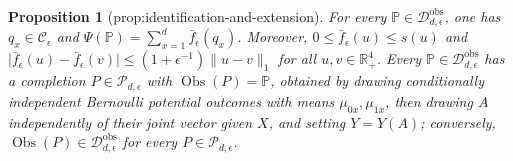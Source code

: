 \documentclass{article}
\newtheorem{proposition}{Proposition}
\begin{document}
\begin{proposition}[prop:identification-and-extension]\label{prop:identification-and-extension}
For every \(\mathbb P\in\mathcal D_{d,\epsilon}^{\mathrm{obs}}\), one has \(q_x\in\mathcal C_\epsilon\) and \(\Psi(\mathbb P)=\sum_{x=1}^d\bar f_\epsilon(q_x)\).  Moreover, \(0\leq\bar f_\epsilon(u)\leq s(u)\) and \(\lvert\bar f_\epsilon(u)-\bar f_\epsilon(v)\rvert\leq(1+\epsilon^{-1})\lVert u-v\rVert_1\) for all \(u,v\in\mathbb R_+^4\).  Every \(\mathbb P\in\mathcal D_{d,\epsilon}^{\mathrm{obs}}\) has a completion \(P\in\mathcal P_{d,\epsilon}\) with \(\operatorname{Obs}(P)=\mathbb P\), obtained by drawing conditionally independent Bernoulli potential outcomes with means \(\mu_{0x},\mu_{1x}\), then drawing \(A\) independently of their joint vector given \(X\), and setting \(Y=Y(A)\); conversely, \(\operatorname{Obs}(P)\in\mathcal D_{d,\epsilon}^{\mathrm{obs}}\) for every \(P\in\mathcal P_{d,\epsilon}\).
\end{proposition}
\end{document}
